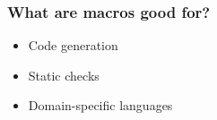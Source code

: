 \documentclass[svgnames,hyperref={bookmarks=false}]{beamer}
\begin{document}
\begin{frame}[fragile]
\frametitle{}

\vskip40pt
\begin{center}
\end{center}
\end{frame}

\begin{frame}[fragile]
\frametitle{What are macros good for?}

\begin{itemize}
\item Code generation
\item Static checks
\item Domain-specific languages
\end{itemize}
\end{frame}
\end{document}
